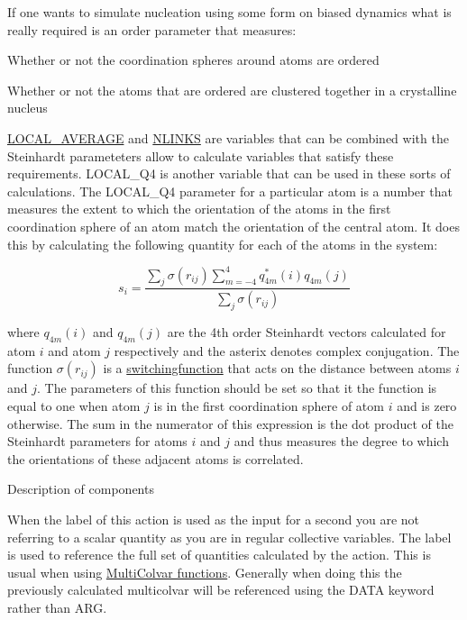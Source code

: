 If one wants to simulate nucleation using some form on biased dynamics what is really required is an order parameter that measures\+:


\begin{DoxyItemize}
\item Whether or not the coordination spheres around atoms are ordered
\item Whether or not the atoms that are ordered are clustered together in a crystalline nucleus
\end{DoxyItemize}

\hyperlink{LOCAL_AVERAGE}{L\+O\+C\+A\+L\+\_\+\+A\+V\+E\+R\+A\+G\+E} and \hyperlink{NLINKS}{N\+L\+I\+N\+K\+S} are variables that can be combined with the Steinhardt parameteters allow to calculate variables that satisfy these requirements. L\+O\+C\+A\+L\+\_\+\+Q4 is another variable that can be used in these sorts of calculations. The L\+O\+C\+A\+L\+\_\+\+Q4 parameter for a particular atom is a number that measures the extent to which the orientation of the atoms in the first coordination sphere of an atom match the orientation of the central atom. It does this by calculating the following quantity for each of the atoms in the system\+:

\[ s_i = \frac{ \sum_j \sigma( r_{ij} ) \sum_{m=-4}^4 q_{4m}^{*}(i)q_{4m}(j) }{ \sum_j \sigma( r_{ij} ) } \]

where $q_{4m}(i)$ and $q_{4m}(j)$ are the 4th order Steinhardt vectors calculated for atom $i$ and atom $j$ respectively and the asterix denotes complex conjugation. The function $\sigma( r_{ij} )$ is a \hyperlink{switchingfunction}{switchingfunction} that acts on the distance between atoms $i$ and $j$. The parameters of this function should be set so that it the function is equal to one when atom $j$ is in the first coordination sphere of atom $i$ and is zero otherwise. The sum in the numerator of this expression is the dot product of the Steinhardt parameters for atoms $i$ and $j$ and thus measures the degree to which the orientations of these adjacent atoms is correlated.

\begin{DoxyParagraph}{Description of components}

\end{DoxyParagraph}
When the label of this action is used as the input for a second you are not referring to a scalar quantity as you are in regular collective variables. The label is used to reference the full set of quantities calculated by the action. This is usual when using \hyperlink{mcolv_multicolvarfunction}{Multi\+Colvar functions}. Generally when doing this the previously calculated multicolvar will be referenced using the D\+A\+T\+A keyword rather than A\+R\+G.

